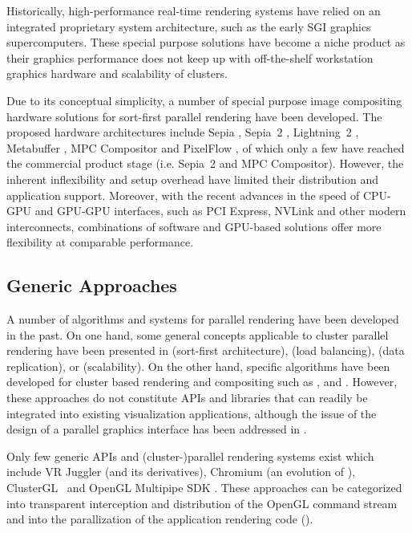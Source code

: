 Historically, high-performance real-time rendering systems have relied on an
integrated proprietary system architecture, such as the early SGI graphics supercomputers. These special purpose solutions have become a niche product as their
graphics performance does not keep up with off-the-shelf workstation graphics
hardware and scalability of clusters.

Due to its conceptual simplicity, a number of special purpose image compositing
hardware solutions for sort-first parallel rendering have been developed. The
proposed hardware architectures include Sepia \cite {MHS:99a,sepia}, Sepia~2
\cite{LMSBHa:01,LMSBH:01}, Lightning~2 \cite{Stoll01}, Metabuffer
\cite{Blanke00,Zhang01}, MPC Compositor \cite{Muraki01} and PixelFlow
\cite{Molnar92,Eyles97}, of which only a few have reached the commercial
product stage (i.e. Sepia~2 and MPC Compositor). However, the inherent
inflexibility and setup overhead have limited their distribution and
application support. Moreover, with the recent advances in the speed of CPU-GPU
and GPU-GPU interfaces, such as PCI Express, NVLink and other modern
interconnects, combinations of software and GPU-based solutions offer more
flexibility at comparable performance.

\subsection{Generic Approaches}

A number of algorithms and systems for parallel rendering have been developed in
the past. On one hand, some general concepts applicable to cluster parallel
rendering have been presented in \cite{Mueller:95,Mueller:97} (sort-first
architecture), \cite{SZFLS:99,SFLS:00} (load balancing), \cite{SFL:01} (data
replication), or \cite{CMF:05,CM:06} (scalability). On the other hand, specific
algorithms have been developed for cluster based rendering and compositing such
as \cite{AP:98}, \cite{CKS:02} and \cite{YYC:01,SMLAP:03}. However, these
approaches do not constitute APIs and libraries that can readily be integrated
into existing visualization applications, although the issue of the design of a
parallel graphics interface has been addressed in \cite{Igehy98}.

Only few generic APIs and (cluster-)parallel rendering systems exist which
include VR Juggler \cite{BJHMBC:01} (and its derivatives), Chromium
\cite{HHNFAKK:02} (an evolution of \cite{Humphreys99,Humphreys00,HEBSEH:01}),
{ClusterGL}~\cite{NHM:11} and OpenGL Multipipe SDK
\cite{JDBJBCER:04,BRE:05,MPK}. These approaches can be categorized into
transparent interception and distribution of the OpenGL command stream and into
the parallization of the application rendering code ().

